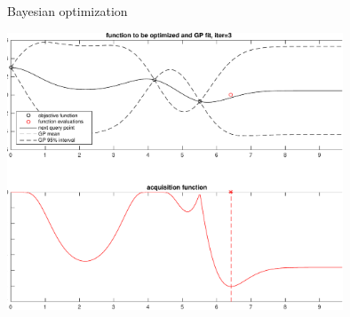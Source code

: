 \documentclass[t]{beamer}
\begin{document}
\begin{frame}
  
  {\Large\color{navyblue} Bayesian optimization}

    \includegraphics[width=10cm]{bayesopt_1d_regular_iter3-crop.pdf}

\end{frame}
\end{document}
